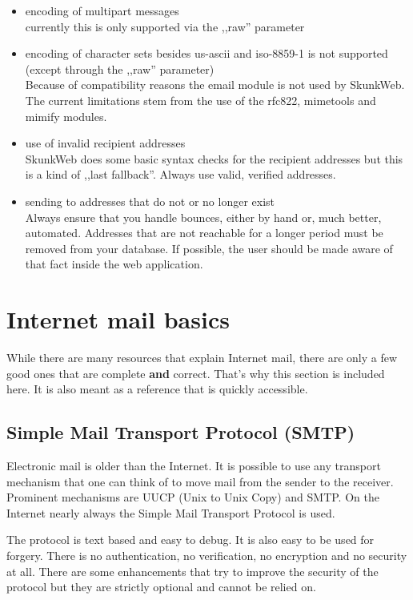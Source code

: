 \documentclass{article}
\begin{document}
\begin{itemize}
  \item encoding of multipart messages\\
        currently this is only supported via the ,,raw'' parameter
  \item encoding of character sets besides us-ascii and iso-8859-1
        is not supported (except through the ,,raw'' parameter)\\
        Because of compatibility reasons the email module is not
	used by SkunkWeb. The current limitations stem from the use
	of the rfc822, mimetools and mimify modules.
  \item use of invalid recipient addresses\\
        SkunkWeb does some basic syntax checks for the recipient addresses
	but this is a kind of ,,last fallback''. Always use valid,
	verified addresses.
  \item sending to addresses that do not or no longer exist\\
        Always ensure that you handle bounces, either by hand or, much
	better, automated. Addresses that are not reachable for a longer
	period must be removed from your database. If possible, the
	user should be made aware of that fact inside the web application.
\end{itemize}


\section{Internet mail basics}

While there are many resources that explain Internet mail, there
are only a few good ones that are complete \textbf{and} correct.
That's why this section is included here. It is also meant as a
reference that is quickly accessible.

\subsection{Simple Mail Transport Protocol (SMTP)}

Electronic mail is older than the Internet. It is possible to use
any transport mechanism that one can think of to move mail from the
sender to the receiver. Prominent mechanisms are UUCP (Unix to Unix Copy)
and SMTP. On the Internet nearly always the Simple Mail Transport
Protocol is used.

The protocol is text based and easy to debug. It is also easy to be used
for forgery. There is no authentication, no verification, no
encryption and no security at all. There are some enhancements that try to
improve the security of the protocol but they are strictly optional and
cannot be relied on.
\end{document}

